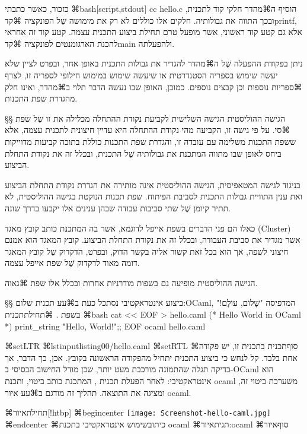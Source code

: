 כזכור, כאשר כתבתי
⌘bash[script,stdout]
cc hello.c
\END
הוסיף ה⌘מהדר חלקי קוד לתכנית, ובכך התווה את גבולותיה. חלקים אלו כוללים לא
רק את מימושה שֶׁל הפונקציה ⌘קד{printf}, אלא גם קטע קוד ראשוני, אשר מופעל טרם
תחילת ביצוע התכנית עצמה. קטע קוד זה אחראי להכנת הארגומנטים לפונקציה ⌘קד{main}
ולהפעלתה.

ניתן בפקודת ההפעלה שֶׁל ה⌘מהדר להגדיר את גבולות התכנית באופן אחר, ובפרט לציין
שלא יעשה שימוש בספריה הסטנדרטית או שיעשה שימוש במימוש חילופי לספריה זו, לצרף
⌘ספריות נוספות וכן קבצים נוספים. כמובן, האופן שבו נעשה הדבר תלוי ב⌘מהדר, ואינו
חלק מהגדרת שפת התכנות.

§§ הגישה ההוליסטית
הגישה השלישית לקביעת נקודת ההתחלה מכלילה את זו שֶׁל שפת ⌘סי. על פי גישה זו,
הקביעה מהי נקודת ההתחלה היא עדיין חיצונית לתכנית עצמה, אלא ששפת התכנות משלימה
עם עובדה זו, והגדרת שפת התכנות כוללת בתוכה קביעות מדוייקות ביחס לאופן שבו מתווה
המתכנת את גבולותיה שֶׁל התכנית, ובכלל זה את נקודת התחלת הביצוע.

בניגוד לגישה המטאפיסית, הגישה ההוליסטית אינה מותירה את הגדרת נקודת התחלת הביצוע
ואת ענין התוויית גבולות התכנית לסביבת הפיתוח. שפת תכנות הנוקטת בגישה ההוליסטית,
לא תתיר קיומן שֶׁל שתי סביבות עבודה שבהן ענינים אלו יקבעו בדרך שונה.

כאלו הם פני הדברים בשפת אייפל לדוגמא, אשר בה המתכנת כותב קובץ מאגד (Cluster)
אשר מגדיר את סביבת העבודה, ובכלל זה את נקודת התחלת הביצוע. קובץ המאגד הוא אמנם
חיצוני לשפה, אך הוא בכל זאת קשור אליה בקשר הדוק, ובפרט, הדקדוק שֶׁל קובץ המאגר
דומה מאוד לדקדוק שֶׁל שפת אייפל עצמה.

הגישה ההוליסטית מופיעה גם בשפות מודרניות אחרות ובכלל אלו שפת ⌘גאוה.

§§ ביצוע אינטראקטיבי
נסתכל כעת ב⌘עע תכנית שלום:OCaml, המדפיסה "שָׁלוֹם, עוֹלָם!" בשפת .
⌘תחילת{תכנית}
⌘bash
cat << EOF > hello.caml
(* Hello World in OCaml *)
print_string "Hello, World!\n";;
EOF
ocaml hello.caml
\END

⌘setLTR
\lstset{language=[Objective]Caml,style=Numbered}
⌘lstinputlisting{00/hello.caml}
⌘setRTL
⌘סוף{תכנית}
בתכנית זו, יש פקודה אחת בלבד.
קל לנחש כי ביצוע התכנית יתחיל מהפקודה הראשונה בקובץ.
אכן, כך הדבר, אך בדיקה תגלה שהתמונה מורכבת מעט יותר, שכן
מודל החישוב הבסיסי ב-OCaml הוא אינטראקטיבי:
לאחר הפעלת תכנית , המתכנת כותב ביטוי, ותכנת ocaml
משערכת ביטוי זה, ומציגה את התוצאה.
תהליך זה מודגם ב⌘עע איור ocaml.

⌘תחילת{איור}[!htbp]
⌘begin{center}
\texttt{[image: Screenshot-hello-caml.jpg]}
⌘end{center}
⌘כיתוב{שימוש אינטראקטיבי בתכנת ocaml}
⌘תגית{איור:ocaml}
⌘סוף{איור}

